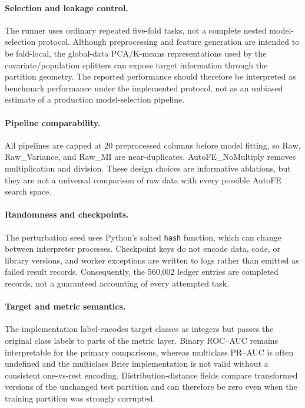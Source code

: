 \documentclass[preprint,12pt]{elsarticle}
\begin{document}
\paragraph{Selection and leakage control.} The runner uses ordinary repeated five-fold tasks, not a complete nested model-selection protocol.  Although preprocessing and feature generation are intended to be fold-local, the global-data PCA/K-means representations used by the covariate/population splitters can expose target information through the partition geometry.  The reported performance should therefore be interpreted as benchmark performance under the implemented protocol, not as an unbiased estimate of a production model-selection pipeline.

\paragraph{Pipeline comparability.} All pipelines are capped at 20 preprocessed columns before model fitting, so Raw, Raw\_Variance, and Raw\_MI are near-duplicates.  AutoFE\_NoMultiply removes multiplication and division.  These design choices are informative ablations, but they are not a universal comparison of raw data with every possible AutoFE search space.

\paragraph{Randomness and checkpoints.} The perturbation seed uses Python’s salted \texttt{hash} function, which can change between interpreter processes.  Checkpoint keys do not encode data, code, or library versions, and worker exceptions are written to logs rather than emitted as failed result records.  Consequently, the 560,002 ledger entries are completed records, not a guaranteed accounting of every attempted task.

\paragraph{Target and metric semantics.} The implementation label-encodes target classes as integers but passes the original class labels to parts of the metric layer.  Binary ROC--AUC remains interpretable for the primary comparisons, whereas multiclass PR--AUC is often undefined and the multiclass Brier implementation is not valid without a consistent one-vs-rest encoding.  Distribution-distance fields compare transformed versions of the unchanged test partition and can therefore be zero even when the training partition was strongly corrupted.
\end{document}
